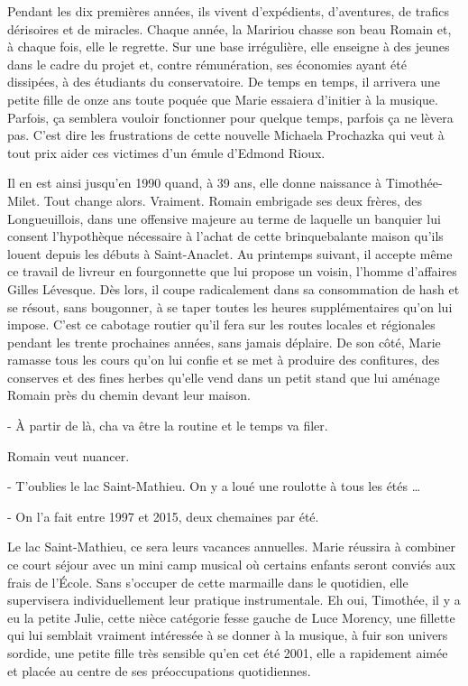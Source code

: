 Pendant les dix premières années, ils vivent d’expédients, d’aventures, de trafics dérisoires et de miracles. Chaque année, la Maririou chasse son beau Romain et, à chaque fois, elle le regrette. Sur une base irrégulière, elle enseigne à des jeunes dans le cadre du projet et, contre rémunération, ses économies ayant été dissipées, à des étudiants du conservatoire. De temps en temps, il arrivera une petite fille de onze ans toute poquée que Marie essaiera d’initier à la musique. Parfois, ça semblera vouloir fonctionner pour quelque temps, parfois ça ne lèvera pas. C’est dire les frustrations de cette nouvelle Michaela Prochazka qui veut à tout prix aider ces victimes d’un émule d’Edmond Rioux.

Il en est ainsi jusqu’en 1990 quand, à 39 ans, elle donne naissance à Timothée-Milet. Tout change alors. Vraiment. Romain embrigade ses deux frères, des Longueuillois, dans une offensive majeure au terme de laquelle un banquier lui consent l’hypothèque nécessaire à l’achat de cette brinquebalante maison qu’ils louent depuis les débuts à Saint-Anaclet. Au printemps suivant, il accepte même ce travail de livreur en fourgonnette que lui propose un voisin, l’homme d’affaires Gilles Lévesque. Dès lors, il coupe radicalement dans sa consommation de hash et se résout, sans bougonner, à se taper toutes les heures supplémentaires qu’on lui impose. C’est ce cabotage routier qu’il fera sur les routes locales et régionales pendant les trente prochaines années, sans jamais déplaire. De son côté, Marie ramasse tous les cours qu’on lui confie et se met à produire des confitures, des conserves et des fines herbes qu’elle vend dans un petit stand que lui aménage Romain près du chemin devant leur maison.

- À partir de là, cha va être la routine et le temps va filer.

Romain veut nuancer.

- T’oublies le lac Saint-Mathieu. On y a loué une roulotte à tous les étés …

- On l’a fait entre 1997 et 2015, deux chemaines par été.

Le lac Saint-Mathieu, ce sera leurs vacances annuelles. Marie réussira à combiner ce court séjour avec un mini camp musical où certains enfants seront conviés aux frais de l’École. Sans s’occuper de cette marmaille dans le quotidien, elle supervisera individuellement leur pratique instrumentale. Eh oui, Timothée, il y a eu la petite Julie, cette nièce catégorie fesse gauche de Luce Morency, une fillette qui lui semblait vraiment intéressée à se donner à la musique, à fuir son univers sordide, une petite fille très sensible qu’en cet été 2001, elle a rapidement aimée et placée au centre de ses préoccupations quotidiennes.

